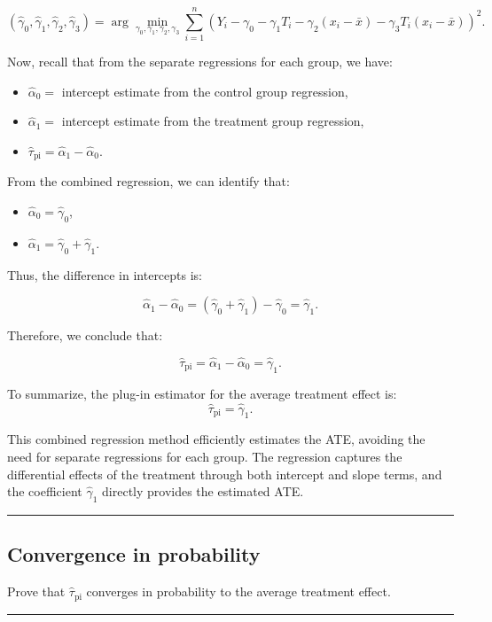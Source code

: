 \documentclass{article}
\newenvironment{colorparagraph}[1]{\par\color{#1}}{\par}
\begin{document}
\[
(\hat{\gamma}_0, \hat{\gamma}_1, \hat{\gamma}_2, \hat{\gamma}_3) = \arg\min_{\gamma_0, \gamma_1, \gamma_2, \gamma_3} \sum_{i=1}^{n} \left( Y_i - \gamma_0 - \gamma_1 T_i - \gamma_2 (x_i - \bar{x}) - \gamma_3 T_i (x_i - \bar{x}) \right)^2.
\]

Now, recall that from the separate regressions for each group, we have:
\begin{itemize}
    \item \(\hat{\alpha}_0 =\) intercept estimate from the control group regression,
    \item \(\hat{\alpha}_1 =\) intercept estimate from the treatment group regression,
    \item \(\hat{\tau}_{\text{pi}} = \hat{\alpha}_1 - \hat{\alpha}_0\).
\end{itemize}

From the combined regression, we can identify that:
\begin{itemize}
    \item \(\hat{\alpha}_0 = \hat{\gamma}_0\),
    \item \(\hat{\alpha}_1 = \hat{\gamma}_0 + \hat{\gamma}_1\).
\end{itemize}

Thus, the difference in intercepts is:

\[
\hat{\alpha}_1 - \hat{\alpha}_0 = (\hat{\gamma}_0 + \hat{\gamma}_1) - \hat{\gamma}_0 = \hat{\gamma}_1.
\]

Therefore, we conclude that:

\[
\hat{\tau}_{\text{pi}} = \hat{\alpha}_1 - \hat{\alpha}_0 = \hat{\gamma}_1.
\]

To summarize, the plug-in estimator for the average treatment effect is:
\[
\hat{\tau}_{\text{pi}} = \hat{\gamma}_1.
\]

This combined regression method efficiently estimates the ATE, avoiding the need for separate regressions for each group. The regression captures the differential effects of the treatment through both intercept and slope terms, and the coefficient \(\hat{\gamma}_1\) directly provides the estimated ATE.

\begin{colorparagraph}{questioncolor}
\rule{\textwidth}{0.5pt}

\label{q2j}\subsection{Convergence in probability}
Prove that \(\hat{\tau}_{\text{pi}}\) converges in probability to the average treatment effect.

\rule{\textwidth}{0.5pt}
\end{colorparagraph}
\end{document}
